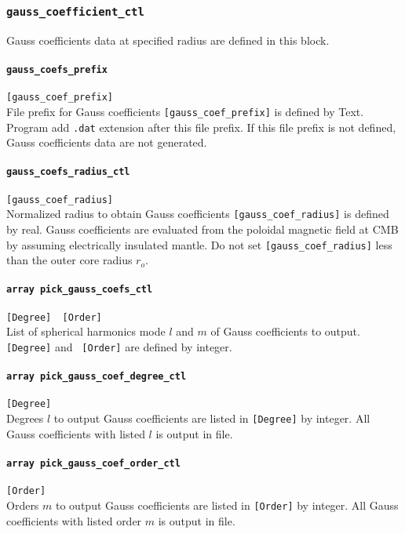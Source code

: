 %
\subsubsection{\tt gauss\_coefficient\_ctl}
\label{href_t:gauss_coefficient_ctl}
Gauss coefficients data at specified radius are defined in this block.

\paragraph{\tt gauss\_coefs\_prefix}
\label{href_t:gauss_coefs_prefix}
\verb|[gauss_coef_prefix]| \\
File prefix for Gauss coefficients \verb|[gauss_coef_prefix]| is defined by Text. Program add {\tt .dat} extension after this file prefix. If this file prefix is not defined, Gauss coefficients data are not generated. 

\paragraph{\tt gauss\_coefs\_radius\_ctl}
\label{href_t:gauss_coefs_radius_ctl}
\verb|[gauss_coef_radius]| \\
Normalized radius to obtain Gauss coefficients \verb|[gauss_coef_radius]| is defined by real. Gauss coefficients are evaluated from the poloidal magnetic field at CMB by assuming electrically insulated mantle. Do not set \verb|[gauss_coef_radius]| less than the outer core radius $r_{o}$.

\paragraph{\tt array pick\_gauss\_coefs\_ctl}
\label{href_t:pick_gauss_coefs_ctl}
\verb|[Degree]  [Order]| \\
List of spherical harmonics mode $l$ and $m$ of Gauss coefficients to output. \verb|[Degree]| and \verb| [Order]| are defined by integer.

\paragraph{\tt array pick\_gauss\_coef\_degree\_ctl}
\label{href_t:pick_gauss_coef_degree_ctl}
\verb|[Degree]| \\
Degrees $l$ to output Gauss coefficients are listed in \verb|[Degree]| by integer. All Gauss coefficients with listed $l$ is output in file.

\paragraph{\tt array pick\_gauss\_coef\_order\_ctl}
\label{href_t:pick_gauss_coef_order_ctl}
\verb|[Order]| \\
Orders $m$ to output Gauss coefficients are listed in \verb|[Order]| by integer. All Gauss coefficients with listed order $m$ is output in file.

